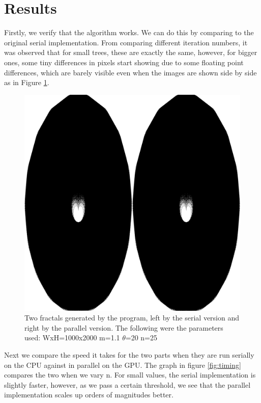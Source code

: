 \section{Results}

Firstly, we verify that the algorithm works. We can do this by comparing to the original serial implementation. From comparing different iteration numbers, it was observed that for small trees, these are exactly the same, however, for bigger ones, some tiny differences in pixels start showing due to some floating point differences, which are barely visible even when the images are shown side by side as in Figure \ref{fig:comparison}.
	
\begin{figure}
	\includegraphics[width=.95\linewidth]{Images/comparison.png}
	\centering
	\caption{Two fractals generated by the program, left by the serial version and right by the parallel version. The following were the parameters used: WxH=1000x2000 m=1.1 $\theta$=20 n=25}
	\label{fig:comparison}
\end{figure}

Next we compare the speed it takes for the two parts when they are run serially on the CPU against in parallel on the GPU. The graph in figure \ref{fig:timing} compares the two when we vary n. For small values, the serial implementation is slightly faster, however, as we pass a certain threshold, we see that the parallel implementation scales up orders of magnitudes better.


